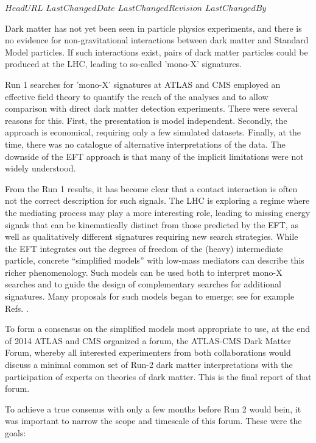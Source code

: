 \svnidlong
{$HeadURL$}
{$LastChangedDate$}
{$LastChangedRevision$}
{$LastChangedBy$}

Dark matter has not yet been seen in particle physics experiments, and
there is no evidence for non-gravitational interactions between dark
matter and Standard Model particles.  If such interactions exist,
pairs of dark matter particles could be produced at the LHC, leading
to so-called 'mono-X' signatures.

Run 1 searches for 'mono-X' signatures at ATLAS and CMS employed an
effective field theory \cite{Goodman:2010ku} to quantify the reach of
the analyses and to allow comparison with direct dark matter detection
experiments. There were several reasons for this.  First, the
presentation is model independent.  Secondly, the approach is
economical, requiring only a few simulated datasets.  Finally, at the
time, there was no catalogue of alternative interpretations of the
data. The downside of the EFT approach is that many of the implicit
limitations were not widely understood.

From the Run 1 results, it has become clear \cite{Busoni:2013lha} that
a contact interaction is often not the correct description for such
signals. The LHC is exploring a regime where the mediating process may
play a more interesting role, leading to missing energy signals that
can be kinematically distinct from those predicted by the EFT, as well
as qualitatively different signatures requiring new search
strategies. While the EFT integrates out the degrees of freedom of the
(heavy) intermediate particle, concrete ``simplified models'' with
low-mass mediators \cite{Alves:2011wf} can describe this richer
phenomenology. Such models can be used both to interpret mono-X
searches and to guide the design of complementary searches for
additional signatures. Many proposals for such models began to emerge;
see for example
Refs. \cite{Tait:2013,Buchmueller:2013dya,Yavin:14092893,Malik:2014ggr,Harris:2014hga,Buckley:2014fba}.

To form a consensus on the simplified models most appropriate to use,
at the end of 2014 ATLAS and CMS organized a forum, the ATLAS-CMS
Dark Matter Forum, whereby all interested experimenters from both
collaborations would discuss a minimal common set of Run-2 dark matter
interpretations with the participation of experts on theories of dark
matter. This is the final report of that forum.

To achieve a true consenus with only a few months before Run 2 would
bein, it was important to narrow the scope and timescale of this
forum. These were the goals:


